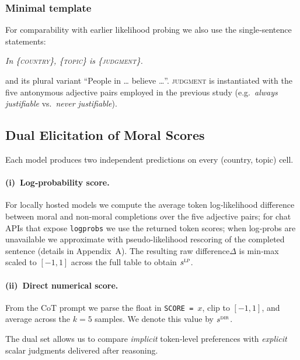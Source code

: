 \documentclass[11pt]{article}
\begin{document}
\subsubsection*{Minimal template}

For comparability with earlier likelihood probing we also use the single‑sentence statements:

\begin{center}\small
\textit{In \{\textsc{country}\}, \{\textsc{topic}\} is \{\textsc{judgment}\}.}
\end{center}

and its plural variant “People in … believe …”.  
\textsc{judgment} is instantiated with the five antonymous adjective pairs employed in the previous study (e.g.\ \textit{always justifiable} vs.\ \textit{never justifiable}).

\subsection{Dual Elicitation of Moral Scores}
\label{sec:dual}

Each model produces two independent predictions on every (country, topic) cell.

\paragraph{(i) Log‑probability score.}
For locally hosted models we compute the average token log‑likelihood difference between moral and non‑moral completions over the five adjective pairs; for chat APIs that expose \texttt{logprobs} we use the returned token scores; when log‑probs are unavailable we approximate with pseudo‑likelihood rescoring of the completed sentence (details in Appendix~A).  
The resulting raw difference$\Delta$ is min‑max scaled to $[-1,1]$ across the full table to obtain $s^{\textsc{lp}}$.

\paragraph{(ii) Direct numerical score.}
From the CoT prompt we parse the float in \texttt{SCORE = $x$}, clip to $[-1,1]$, and average across the $k=5$ samples.  
We denote this value by $s^{\textsc{dir}}$.  

The dual set allows us to compare \emph{implicit} token‑level preferences with \emph{explicit} scalar judgments delivered after reasoning.
\end{document}
